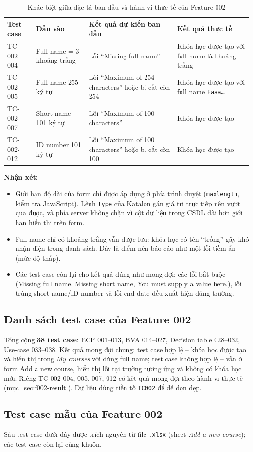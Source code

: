 \begin{table}[H]
\centering\footnotesize
\begin{tabular}{|l|L{3.3cm}|L{4.3cm}|L{4.6cm}|}
\hline
{}\textbf{Test case} & \textbf{Đầu vào} & \textbf{Kết quả dự kiến ban đầu} & \textbf{Kết quả thực tế} \\ \hline
TC-002-004 & Full name = 3 khoảng trắng & Lỗi ``Missing full name'' & Khóa học được tạo với full name là khoảng trắng \\ \hline
TC-002-005 & Full name 255 ký tự & Lỗi ``Maximum of 254 characters'' hoặc bị cắt còn 254 & Khóa học được tạo với full name \texttt{Faaa\dots} \\ \hline
TC-002-007 & Short name 101 ký tự & Lỗi ``Maximum of 100 characters'' & Khóa học được tạo \\ \hline
TC-002-012 & ID number 101 ký tự & Lỗi ``Maximum of 100 characters'' hoặc bị cắt còn 100 & Khóa học được tạo \\ \hline
\end{tabular}
\caption{Khác biệt giữa đặc tả ban đầu và hành vi thực tế của Feature 002}
\end{table}

\textbf{Nhận xét:}
\begin{itemize}[noitemsep]
  \item Giới hạn độ dài của form chỉ được áp dụng ở phía trình duyệt (\texttt{maxlength}, kiểm tra JavaScript). Lệnh \texttt{type}
        của Katalon gán giá trị trực tiếp nên vượt qua được, và phía server không chặn vì cột dữ liệu trong CSDL dài hơn
        giới hạn hiển thị trên form.
  \item Full name chỉ có khoảng trắng vẫn được lưu: khóa học có tên ``trống'' gây khó nhận diện trong danh sách. Đây là điểm
        nên báo cáo như một lỗi tiềm ẩn (mức độ thấp).
  \item Các test case còn lại cho kết quả đúng như mong đợi: các lỗi bắt buộc (Missing full name, Missing short name, You must supply a value here.),
        lỗi trùng short name/ID number và lỗi end date đều xuất hiện đúng trường.
\end{itemize}

\subsection{Danh sách test case của Feature 002}
Tổng cộng \textbf{38 test case}: ECP 001--013, BVA 014--027, Decision table 028--032, Use-case 033--038.
Kết quả mong đợi chung: test case hợp lệ -- khóa học được tạo và hiển thị trong \textit{My courses} với đúng full name;
test case không hợp lệ -- vẫn ở form Add a new course, hiển thị lỗi tại trường tương ứng và không có khóa học mới.
Riêng TC-002-004, 005, 007, 012 có kết quả mong đợi theo hành vi thực tế (mục~\ref{sec:f002-result}).
Dữ liệu dùng tiền tố \texttt{TC002} để dễ dọn dẹp.



\subsection{Test case mẫu của Feature 002}
Sáu test case dưới đây được trích nguyên từ file \texttt{.xlsx} (sheet \textit{Add a new course}); các test case còn lại cùng khuôn.


